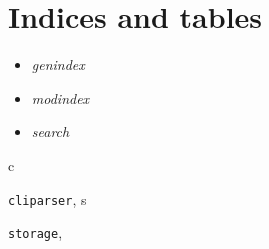 \documentclass[letterpaper,10pt,english]{sphinxmanual}
\begin{document}
\chapter{Indices and tables}
\label{index:indices-and-tables}\begin{itemize}
\item {} 
\emph{genindex}

\item {} 
\emph{modindex}

\item {} 
\emph{search}

\end{itemize}


\renewcommand{\indexname}{Python Module Index}
\begin{theindex}
\def\bigletter#1{{\Large\sffamily#1}\nopagebreak\vspace{1mm}}
\bigletter{c}
\item {\texttt{cliparser}}, \pageref{index:module-cliparser}
\indexspace
\bigletter{s}
\item {\texttt{storage}}, \pageref{index:module-storage}
\end{theindex}

\renewcommand{\indexname}{Index}
\printindex
\end{document}
